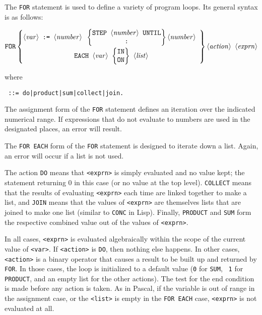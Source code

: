 The {\tt FOR} statement is used to define a variety of program
loops.  Its general syntax is as follows:
\begin{small}
\[ \mbox{\tt FOR} \left\{ \begin{array}{@{}ccc@{}}
    \mbox{\tt \meta{var} := \meta{number} } \left\{ \begin{array}{@{}c@{}}
    \mbox{\tt STEP \meta{number} UNTIL} \\
    \mbox{\tt :}
    \end{array}
    \right\} \mbox{\tt \meta{number}} \\[3mm]
    \multicolumn{1}{c}{\mbox{\tt EACH \meta{var}
       \(\left\{
          \begin{tabular}{@{}c@{}}
              IN \\ ON
          \end{tabular}
       \right\}\)
       \meta{list}}}
    \end{array}
    \right\} \mbox{\tt \meta{action} \meta{exprn}} \]
\end{small}%
%
where
\begin{center}
\tt       {} ::= do|product|sum|collect|join.
\end{center}
The assignment form of the {\tt FOR} statement defines an
iteration over the indicated numerical range.  If expressions that do not
evaluate to numbers are used in the designated places, an error will
result.

The {\tt FOR EACH} form of the {\tt FOR} statement is
designed to iterate down a list.  Again, an error will occur if a list is
not used.

The action {\tt DO} means that {\tt <exprn>} is simply
evaluated and no value kept; the statement returning 0 in this case (or no
value at the top level). {\tt COLLECT} means that the results of
evaluating {\tt <exprn>} each time are linked together to make a list,
and {\tt JOIN} means that the values of {\tt <exprn>} are themselves
lists that are joined to make one list (similar to {\tt CONC} in Lisp).
Finally, {\tt PRODUCT} and {\tt SUM}
form the respective combined value out of the values of {\tt <exprn>}.

In all cases, {\tt <exprn>} is evaluated algebraically within the
scope of the current value of {\tt <var>}.  If {\tt <action>} is
{\tt DO}, then nothing else happens.  In other cases, {\tt
<action>} is a binary operator that causes a result to be built up and
returned by {\tt FOR}.  In those cases, the loop is
initialized to a default value ({\tt 0} for {\tt SUM}, {\tt
1} for {\tt PRODUCT}, and an empty list for the other
actions).  The test for the end condition is made before any action is
taken.  As in Pascal, if the variable is out of range in the assignment
case, or the {\tt <list>} is empty in the {\tt FOR EACH}
case, {\tt <exprn>} is not evaluated at all.

